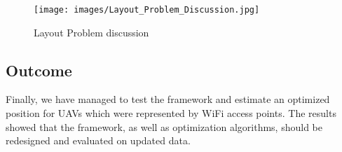\begin{figure}[H]
	\centering
	\texttt{[image: images/Layout\_Problem\_Discussion.jpg]}
\caption{Layout Problem discussion}
\end{figure}

\subsection{Outcome}

Finally, we have managed to test the framework and estimate an optimized
position for UAVs which were represented by WiFi access points. The
results showed that the framework, as well as optimization algorithms,
should be redesigned and evaluated on updated data.

